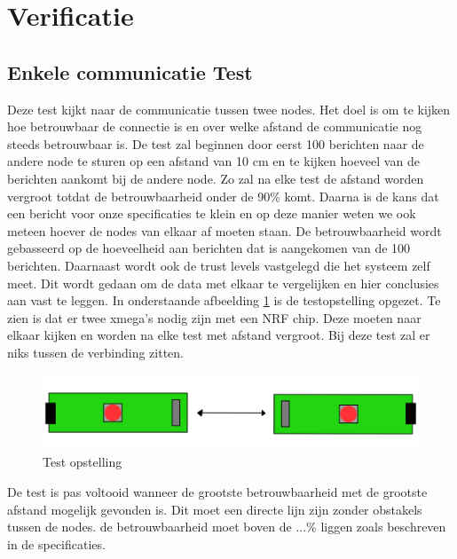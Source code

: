 \section{Verificatie}


\subsection{Enkele communicatie Test}
Deze test kijkt naar de communicatie tussen twee nodes. Het doel is om te kijken hoe betrouwbaar de connectie is en 
over welke afstand de communicatie nog steeds betrouwbaar is. De test zal beginnen door eerst 100 berichten naar de andere 
node te sturen op een afstand van 10 cm en te kijken hoeveel van de berichten aankomt bij de andere node. Zo zal na elke test de 
afstand worden vergroot totdat de betrouwbaarheid onder de 90\% komt. Daarna is de kans dat een bericht voor onze specificaties te 
klein en op deze manier weten we ook meteen hoever de nodes van elkaar af moeten staan. De betrouwbaarheid wordt gebasseerd op de 
hoeveelheid aan berichten dat is aangekomen van de 100 berichten. Daarnaast wordt ook de trust levels vastgelegd 
die het systeem zelf meet. Dit wordt gedaan om de data met elkaar te vergelijken en hier conclusies aan vast te leggen.
In onderstaande afbeelding \ref{fig:TestCom} is de testopstelling opgezet. Te zien is dat er twee xmega's nodig zijn met een NRF chip. 
Deze moeten naar elkaar kijken en worden na elke test met afstand vergroot. Bij deze test zal er niks tussen de verbinding zitten.
\begin{figure}[h]
    \centering
    \includegraphics{img/Screenshot_292.png}
    \caption{Test opstelling}
    \label{fig:TestCom}
\end{figure}
De test is pas voltooid wanneer de grootste betrouwbaarheid met de grootste afstand mogelijk gevonden is. Dit moet een directe 
lijn zijn zonder obstakels tussen de nodes. de betrouwbaarheid moet boven de ...\% liggen zoals beschreven in de specificaties.
